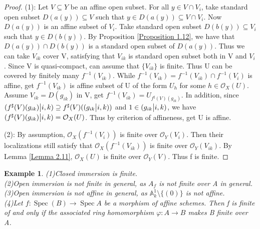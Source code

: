 \documentclass{ctexart}
\newtheorem{example}{Example}[section]
\newcommand{\spec}{\operatorname{Spec}}
\begin{document}
\begin{proof}
    (1): Let $V \subseteq Y$ be an affine open subset.
    For all $y\in V \cap V_{i}$, take standard open subset $D(a(y)) \subseteq V$ such that $y\in D(a(y)) \subseteq V \cap V_{i}$.
    Now $D(a(y))$ is an affine subset of $V_{i}$.
    Take standard open subset $D(b(y)) \subseteq V_{i}$ such that $y\in D(b(y))$.
    By Proposition \ref{Proposition 1.12}, we have that $D(a(y)) \cap D(b(y))$ is a standard open subset of $D(a(y))$.
    Thus we can take $V_{ik}$ cover V, satisfying that $V_{ik}$ is standard open subset both in V and $V_{i}$.
    Since V is quasi-compact, can assume that $\{V_{ik}\}$ is finite.
    Thus U can be covered by finitely many $f^{-1}(V_{ik})$.
    While $f^{-1}(V_{ik}) = f^{-1}(V_{ik}) \cap f^{-1}(V_{i})$ is affine, get $f^{-1}(V_{ik})$ is affine subset of U of the form $U_{h}$ for some $h\in \mathcal{O}_{X}(U)$.
    Assume $V_{ik} = D(g_{ik})$ in V, get $f^{-1}(V_{ik}) = U_{f^{\sharp}(V)(g_{ik})}$.
    In addition, since $(f^{\sharp}(V)(g_{ik}) \big{|} i,k) \supseteq f^{\sharp}(V)((g_{ik} \big{|} i,k))$ and $1\in (g_{ik} \big{|} i,k)$, we have $(f^{\sharp}(V)(g_{ik}) \big{|} i,k) = \mathcal{O}_{X}(U)$.
    Thus by criterion of affineness, get U is affine.
    \par
    (2): By assumption, $\mathcal{O}_{X}(f^{-1}(V_{i}))$ is finite over $\mathcal{O}_{Y}(V_{i})$.
    Then their localizations still satisfy that $\mathcal{O}_{X}(f^{-1}(V_{ik}))$ is finite over $\mathcal{O}_{Y}(V_{ik})$.
    By Lemma \ref{Lemma 2.11}, $\mathcal{O}_{X}(U)$ is finite over $\mathcal{O}_{Y}(V)$.
    Thus f is finite.
\end{proof}
\begin{example}
    (1)Closed immersion is finite. \\
    (2)Open immersion is not finite in general, as $A_{f}$ is not finite over A in general. \\
    (3)Open immersion is not affine in general, as $\mathbb{A}_{k}^{1} \setminus \{(0)\}$ is not affine. \\
    (4)Let $f: \spec(B) \longrightarrow \spec A$ be a morphism of affine schemes.
    Then f is finite of and only if the associated ring homomorphism $\varphi: A \longrightarrow B$ makes B finite over A.
\end{example}
\end{document}
